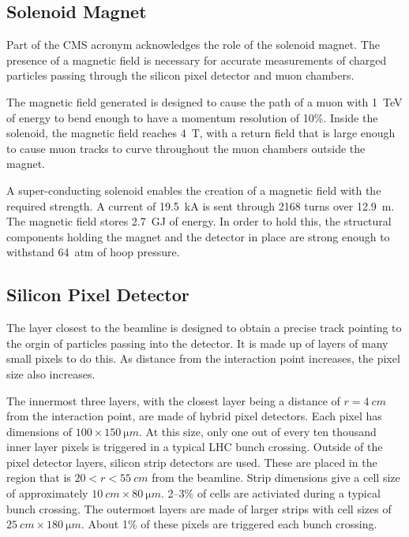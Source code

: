 \subsection{Solenoid Magnet}

Part of the CMS acronym acknowledges the role of the solenoid magnet.
The presence of a magnetic field is necessary for accurate measurements
of charged particles passing through the silicon pixel detector and muon chambers.

The magnetic field generated is designed to cause the path of
a muon with \SI{1}{TeV} of energy to bend enough to have a momentum resolution of 10\%.
Inside the solenoid, the magnetic field reaches \SI{4}{T},
with a return field that is large enough to cause muon tracks to curve throughout
the muon chambers outside the magnet.

A super-conducting solenoid enables the creation of a magnetic field
with the required strength.
A current of \SI{19.5}{kA} is sent through 2168 turns over \SI{12.9}{m}.
The magnetic field stores \SI{2.7}{GJ} of energy.
In order to hold this, the structural components holding the magnet and
the detector in place are strong enough to withstand \SI{64}{atm} of hoop pressure.

\subsection{Silicon Pixel Detector}

The layer closest to the beamline is designed to obtain a precise track pointing
to the orgin of particles passing into the detector.
It is made up of layers of many small pixels to do this.
As distance from the interaction point increases, the pixel size also increases.

The innermost three layers, with the closest layer being a distance of $r=\SI{4}{cm}$ from the interaction point,
are made of hybrid pixel detectors.
Each pixel has dimensions of $100 \times \SI{150}{\micro m}$.
At this size, only one out of every ten thousand inner layer pixels is triggered in a typical LHC bunch crossing.
Outside of the pixel detector layers,
silicon strip detectors are used.
These are placed in the region that is $20 < r < \SI{55}{cm}$ from the beamline.
Strip dimensions give a cell size of approximately $\SI{10}{cm} \times \SI{80}{\micro m}$.
2--3\% of cells are activiated during a typical bunch crossing.
The outermost layers are made of larger strips with cell sizes of $\SI{25}{cm} \times \SI{180}{\micro m}$.
About 1\% of these pixels are triggered each bunch crossing.

